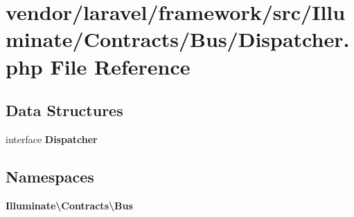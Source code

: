 \section{vendor/laravel/framework/src/\+Illuminate/\+Contracts/\+Bus/\+Dispatcher.php File Reference}
\label{_contracts_2_bus_2_dispatcher_8php}
\subsection*{Data Structures}
\begin{DoxyCompactItemize}
\item 
interface {\bf Dispatcher}
\end{DoxyCompactItemize}
\subsection*{Namespaces}
\begin{DoxyCompactItemize}
\item 
 {\bf Illuminate\textbackslash{}\+Contracts\textbackslash{}\+Bus}
\end{DoxyCompactItemize}
